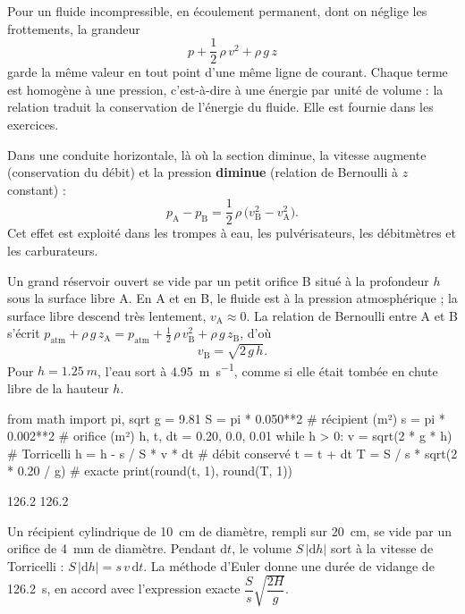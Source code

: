 \begin{loi}
Pour un fluide incompressible, en écoulement permanent, dont on néglige les frottements, la grandeur
\[p+\frac12\,\rho\,v^2+\rho\,g\,z\]
garde la même valeur en tout point d'une même ligne de courant. Chaque terme est homogène à une pression, c'est-à-dire
à une énergie par unité de volume : la relation traduit la conservation de l'énergie du fluide. Elle est fournie dans
les exercices.
\end{loi}
\begin{propriete}
Dans une conduite horizontale, là où la section diminue, la vitesse augmente (conservation du débit) et la pression
\textbf{diminue} (relation de Bernoulli à $z$ constant) :
\[p_\mathrm{A}-p_\mathrm{B}=\frac12\,\rho\,\big(v_\mathrm{B}^2-v_\mathrm{A}^2\big).\]
Cet effet est exploité dans les trompes à eau, les pulvérisateurs, les débitmètres et les carburateurs.
\end{propriete}
\begin{savoirfaire}
Un grand réservoir ouvert se vide par un petit orifice B situé à la profondeur $h$ sous la surface libre A. En A et en
B, le fluide est à la pression atmosphérique ; la surface libre descend très lentement, $v_\mathrm{A}\approx0$. La relation
de Bernoulli entre A et B s'écrit $p_\mathrm{atm}+\rho\,g\,z_\mathrm{A}=p_\mathrm{atm}+\frac12\,\rho\,v_\mathrm{B}^2+\rho\,g\,z_\mathrm{B}$,
d'où
\[v_\mathrm{B}=\sqrt{2\,g\,h}.\]
Pour $h=\qty{1,25}{m}$, l'eau sort à \qty{4,95}{m.s^{-1}}, comme si elle était tombée en chute libre de la hauteur $h$.
\end{savoirfaire}
\begin{codecote}[0.62]
\begin{pythoncol}
from math import pi, sqrt
g = 9.81
S = pi * 0.050**2       # récipient (m²)
s = pi * 0.002**2       # orifice (m²)
h, t, dt = 0.20, 0.0, 0.01
while h > 0:
    v = sqrt(2 * g * h)       # Torricelli
    h = h - s / S * v * dt    # débit conservé
    t = t + dt
T = S / s * sqrt(2 * 0.20 / g)   # exacte
print(round(t, 1), round(T, 1))
\end{pythoncol}
\begin{consolecol}
126.2 126.2
\end{consolecol}
\cote
\fontsize{9.5}{12.5}\selectfont
{}\par\smallskip
Un récipient cylindrique de \qty{10}{cm} de diamètre, rempli sur \qty{20}{cm}, se vide par un orifice de \qty{4}{mm} de
diamètre. Pendant $\mathrm{d}t$, le volume $S\,|\mathrm{d}h|$ sort à la vitesse de Torricelli : $S\,|\mathrm{d}h|=s\,v\,\mathrm{d}t$.
La méthode d'Euler donne une durée de vidange de \qty{126,2}{s}, en accord avec l'expression exacte
$\dfrac{S}{s}\sqrt{\dfrac{2H}{g}}$.
\end{codecote}
